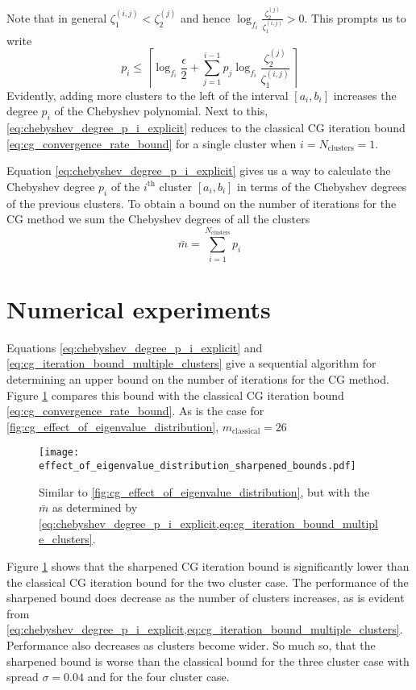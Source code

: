 Note that in general $\zeta^{(i,j)}_1 < \zeta^{(j)}_2$ and hence $\log_{f_i}{\frac{\zeta^{(j)}_2}{\zeta^{(i,j)}_1}} > 0$. This prompts us to write
\begin{equation}
    p_i \leq \left\lceil\log_{f_i}{\frac{\epsilon}{2}} + \sum_{j=1}^{i-1} p_j\log_{f_i}{\frac{\zeta^{(j)}_2}{\zeta^{(i,j)}_1}} \right\rceil
    \label{eq:chebyshev_degree_p_i_explicit}
\end{equation}
Evidently, adding more clusters to the left of the interval $[a_i,b_i]$ increases the degree $p_i$ of the Chebyshev polynomial. Next to this, \cref{eq:chebyshev_degree_p_i_explicit} reduces to the classical CG iteration bound \cref{eq:cg_convergence_rate_bound} for a single cluster when $i = N_{\text{clusters}} = 1$.

Equation \ref{eq:chebyshev_degree_p_i_explicit} gives us a way to calculate the Chebyshev degree $p_i$ of the $i^{\text{th}}$ cluster $[a_i,b_i]$ in terms of the Chebyshev degrees of the previous clusters. To obtain a bound on the number of iterations for the CG method we sum the Chebyshev degrees of all the clusters
\begin{equation}
    \bar{m} = \sum_{i=1}^{N_{\text{clusters}}} p_i
    \label{eq:cg_iteration_bound_multiple_clusters}
\end{equation}

\section{Numerical experiments}\label{sec:cg_sharpened_convrate_numerical_experiments}
Equations \ref{eq:chebyshev_degree_p_i_explicit} and \ref{eq:cg_iteration_bound_multiple_clusters} give a sequential algorithm for determining an upper bound on the number of iterations for the CG method. Figure \ref{fig:cg_sharpened_bound} compares this bound with the classical CG iteration bound \cref{eq:cg_convergence_rate_bound}. As is the case for \cref{fig:cg_effect_of_eigenvalue_distribution}, $m_{\text{classical}} = 26$
\begin{figure}[H] 
    \centering
    \texttt{[image: effect\_of\_eigenvalue\_distribution\_sharpened\_bounds.pdf]}
    \caption{Similar to \cref{fig:cg_effect_of_eigenvalue_distribution}, but with the $\bar{m}$ as determined by \cref{eq:chebyshev_degree_p_i_explicit,eq:cg_iteration_bound_multiple_clusters}.}
    \label{fig:cg_sharpened_bound}
\end{figure}
Figure \ref{fig:cg_sharpened_bound} shows that the sharpened CG iteration bound is significantly lower than the classical CG iteration bound for the two cluster case. The performance of the sharpened bound does decrease as the number of clusters increases, as is evident from \cref{eq:chebyshev_degree_p_i_explicit,eq:cg_iteration_bound_multiple_clusters}. Performance also decreases as clusters become wider. So much so, that the sharpened bound is worse than the classical bound for the three cluster case with spread $\sigma = 0.04$ and for the four cluster case.

